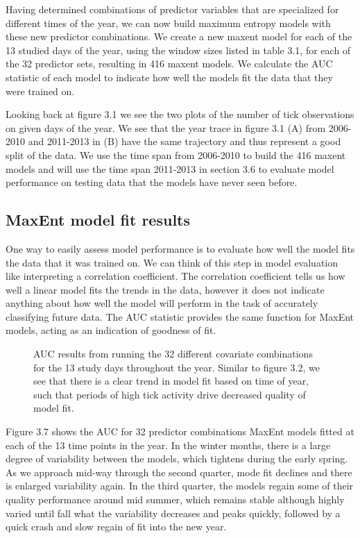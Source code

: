 Having determined combinations of predictor variables that are specialized for different times of the year, we can now build maximum entropy models with these new predictor combinations. We create a new maxent model for each of the 13 studied days of the year, using the window sizes listed in table 3.1, for each of the 32 predictor sets, resulting in 416 maxent models. We calculate the AUC statistic of each model to indicate how well the models fit the data that they were trained on. \newline

\noindent Looking back at figure 3.1 we see the two plots of the number of tick observations on given days of the year. We see that the year trace in figure 3.1 (A)  from 2006-2010 and 2011-2013 in (B) have the same trajectory and thus represent a good split of the data. We use the time span from 2006-2010 to build the 416 maxent models and will use the time span 2011-2013 in section 3.6 to evaluate model performance on testing data that the models have never seen before. \newline

\subsection{ MaxEnt model fit results}

One way to easily assess model performance is to evaluate how well the model fits the data that it was trained on. We can think of this step in model evaluation like interpreting a correlation coefficient. The correlation coefficient tells us how well a linear model fits the trends in the data, however it does not indicate anything about how well the model will perform in the task of accurately classifying future data. The AUC statistic provides the same function for MaxEnt models, acting as an indication of goodness of fit. \newline

\begin{figure} [!ht]
\centerline{}
\caption{AUC results from running the 32 different covariate combinations for the 13 study days throughout the year. Similar to figure 3.2, we see that there is a clear trend in model fit based on time of year, such that periods of high tick activity drive decreased quality of model fit.  }
\label{fig6}
\end{figure}


\noindent Figure 3.7 shows the AUC for 32 predictor combinations MaxEnt models fitted at each of the 13 time points in the year. In the winter months, there is a large degree of variability between the models, which tightens during the early spring. As we approach mid-way through the second quarter, mode fit declines and there is enlarged variability again. In the third quarter, the models regain some of their quality performance around mid summer, which remains stable although highly varied until fall what the variability decreases and peaks quickly, followed by a quick crash and slow regain of fit into the new year. 


